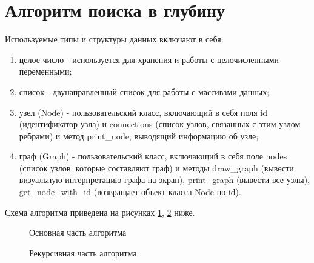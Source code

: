 \section{Алгоритм поиска в глубину}

Используемые типы и структуры данных включают в себя:
\begin{enumerate}
	\item целое число - используется для хранения и работы с целочисленными переменными;
	\item список - двунаправленный список для работы с массивами данных;
	\item узел (Node) - пользовательский класс, включающий в себя поля id (идентификатор узла) и connections (список узлов, связанных с этим узлом ребрами) и метод print\_node, выводящий информацию об узле;\\
	\item граф (Graph) - пользовательский класс, включающий в себя поле nodes (список узлов, которые составляют граф) и методы draw\_graph (вывести визуальную интерпретацию графа на экран), print\_graph (вывести все узлы), get\_node\_with\_id (возвращает объект класса Node по id).\\
\end{enumerate}

Схема алгоритма приведена на рисунках \ref{fig:algos_simple}, \ref{fig:algos_simple_rec} ниже.

\begin{figure}[H]
	\caption{Основная часть алгоритма}
	\label{fig:algos_simple}
\end{figure}

\begin{figure}[H]
	\caption{Рекурсивная часть алгоритма}
	\label{fig:algos_simple_rec}
\end{figure}

